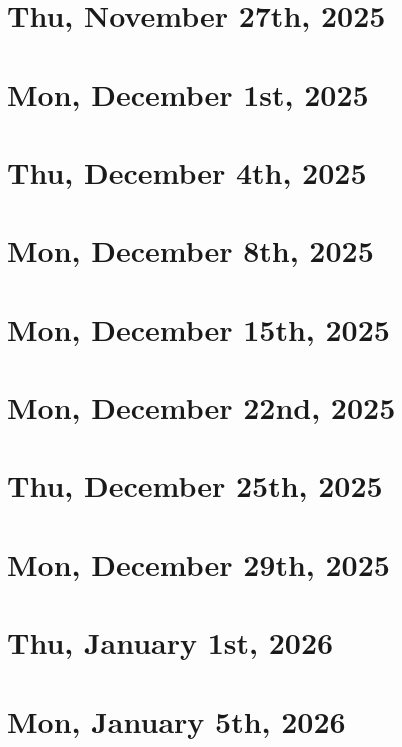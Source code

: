 \documentclass[a4paper]{report}
\begin{document}
\chapter{Thu, November 27th, 2025}


\chapter{Mon, December 1st, 2025}


\chapter{Thu, December 4th, 2025}


\chapter{Mon, December 8th, 2025}


\chapter{Mon, December 15th, 2025}


\chapter{Mon, December 22nd, 2025}


\chapter{Thu, December 25th, 2025}


\chapter{Mon, December 29th, 2025}


\chapter{Thu, January 1st, 2026}


\chapter{Mon, January 5th, 2026}

\end{document}
